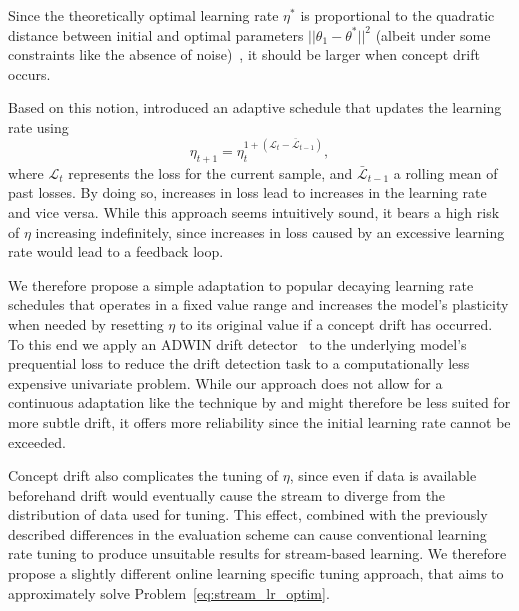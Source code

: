 \documentclass[letterpaper]{article} %
\begin{document}
Since the theoretically optimal learning rate $\eta^*$ is proportional to the quadratic distance between initial and optimal parameters $||\theta_1 - \theta^*||^2$ (albeit under some constraints like the absence of noise)~\cite{carmonMakingSGDParameterFree2023}, it should be larger when concept drift occurs.

Based on this notion, \citet{kunchevaAdaptiveLearningRate2008} introduced an adaptive schedule that updates the learning rate using
\begin{equation}
	\eta_{t+1} = \eta_t^{1+(\mathcal{L}_t - \bar{\mathcal{L}}_{t-1})},
\end{equation}
where $\mathcal{L}_t$ represents the loss for the current sample, and $\bar{\mathcal{L}}_{t-1}$ a rolling mean of past losses.
By doing so, \citet{kunchevaAdaptiveLearningRate2008} increases in loss lead to increases in the learning rate and vice versa.
While this approach seems intuitively sound, it bears a high risk of $\eta$ increasing indefinitely, since increases in loss caused by an excessive learning rate would lead to a feedback loop.

We therefore propose a simple adaptation to popular decaying learning rate schedules that operates in a fixed value range and increases the model's plasticity when needed by resetting $\eta$ to its original value if a concept drift has occurred.
To this end we apply an ADWIN drift detector~\cite{bifetLearningTimeChangingData2007} to the underlying model's prequential loss to reduce the drift detection task to a computationally less expensive univariate problem.
While our approach does not allow for a continuous adaptation like the technique by \citet{kunchevaAdaptiveLearningRate2008} and might therefore be less suited for more subtle drift, it offers more reliability since the initial learning rate cannot be exceeded.

Concept drift also complicates the tuning of $\eta$, since even if data is available beforehand drift would eventually cause the stream to diverge from the distribution of data used for tuning.
This effect, combined with the previously described differences in the evaluation scheme can cause conventional learning rate tuning to produce unsuitable results for stream-based learning.
We therefore propose a slightly different online learning specific tuning approach, that aims to approximately solve Problem~\ref{eq:stream_lr_optim}.
\end{document}
